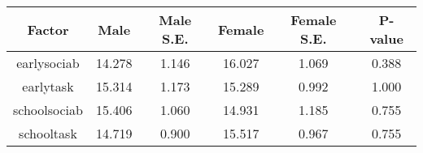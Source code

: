 \begin{longtable}{c c c c c c}
\toprule
\textbf{Factor} & \textbf{Male} & \textbf{Male S.E.}  & \textbf{Female} & \textbf{Female S.E.} & \textbf{P-value} \\
\midrule
earlysociab & 14.278 & 1.146 &  16.027 & 1.069 & 0.388 \\
earlytask & 15.314 & 1.173 &  15.289 & 0.992 & 1.000 \\
schoolsociab & 15.406 & 1.060 &  14.931 & 1.185 & 0.755 \\
schooltask & 14.719 & 0.900 &  15.517 & 0.967 & 0.755 \\
\bottomrule
\end{longtable}

